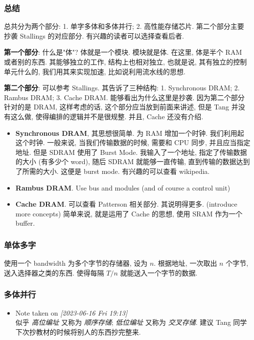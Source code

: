 \documentclass[11pt]{article}
\begin{document}
\subsubsection{总结}
\label{sec:orge065b2c}

总共分为两个部分: 1. 单字多体和多体并行; 2. 高性能存储芯片. 第二个部分主要抄袭 Stallings 的对应部分. 有兴趣的读者可以选择查看后者.

\textbf{第一个部分}: 什么是"体"? 体就是一个模块. 模块就是体. 在这里, 体是半个 RAM 或者别的东西. 其能够独立的工作, 结构上也相对独立, 也就是说, 其有独立的控制单元什么的, 我们用其来实现加速, 比如说利用流水线的思想.

\textbf{第二个部分}: 可以参考 Stallings. 其告诉了三种结构: 1. Synchronous DRAM; 2. Rambus DRAM; 3. Cache DRAM. 能够看出为什么这里是抄袭. 因为第二个部分针对的是 DRAM, 这样考虑的话, 这个部分应当放到前面来讲述, 但是 Tang 并没有这么做, 使得编排的逻辑并不是很规整. 并且, Cache 还没有介绍.

\begin{itemize}
\item \textbf{Synchronous DRAM}, 其思想很简单. 为 RAM 增加一个时钟. 我们利用起这个时钟. 一般来说, 当我们传输数据的时候, 需要和 CPU 同步, 并且应当指定地址. 但是 SDRAM 使用了 Burst Mode. 我输入了一个地址, 指定了传输数据的大小 (有多少个 word), 随后 SDRAM 就能够一直传输, 直到传输的数据达到了所需的大小. 这便是 burst mode. 有兴趣的可以查看 wikipedia.
\item \textbf{Rambus DRAM}.  Use bus and modules (and of course a control unit)
\item \textbf{Cache DRAM}. 可以查看 Patterson 相关部分. 其说明得更多. (introduce more concepts) 简单来说, 就是运用了 Cache 的思想, 使用 SRAM 作为一个 buffer.
\end{itemize}

\subsubsection{单体多字}
\label{sec:orgea27a20}

使用一个 bandwidth 为多个字节的存储器, 设为 \(n\). 根据地址, 一次取出
\(n\) 个字节, 送入选择器之类的东西. 使得每隔 \(T\big/ n\) 就能送入一个字节的数据.

\subsubsection{多体并行}
\label{sec:orgae04307}
\label{org0dfc15a}

\begin{itemize}
\item Note taken on \textit{[2023-06-16 Fri 19:13] } \\
似乎 \emph{高位编址} 又称为 \emph{顺序存储}; \emph{低位编址} 又称为 \emph{交叉存储}. 建议 Tang 同学下次抄教材的时候将别人的东西抄完整来.
\end{itemize}
\end{document}
